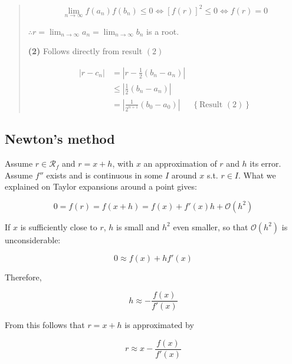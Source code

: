 \documentclass[12pt]{article}
\theoremstyle{definition}
\begin{document}
\begin{quote}
\begin{equation*}
    \lim_{n \to \infty} f(a_n)f(b_n) \leq 0 \iff [f(r)]^2 \leq 0 \iff f(r) = 0
\end{equation*}

$\therefore r = \lim_{n \to \infty} a_n = \lim_{n \to \infty} b_n$ is a root.

\textbf{(2)} Follows directly from result $(2)$

\begin{align*}
    \left| r - c_n \right|  &= \left| r - \frac{1}{2}(b_n - a_n) \right| \\ 
                            &\leq
    \left| \frac{1}{2}(b_n - a_n) \right| \\ 
&=\left| \frac{1}{2^{n+1}}(b_0 - a_0) \right| &\left\{ \text{Result }(2)
\right\} 
\end{align*}



\end{quote}
\normalsize

\pagebreak 

\subsection{Newton's method}


Assume $r \in \mathcal{R}_f$ and $r = x + h$, with $x$ an approximation of $r$
and $h$ its error. Assume $f''$ exists and is continuous in some $I$ around $x$
s.t. $r \in I$. What we explained on Taylor expansions around a point gives:

\begin{equation*}
    0 = f(r) = f(x + h) = f(x) + f'(x)h + \mathcal{O}(h^2)
\end{equation*}

If $x$ is sufficiently close to $r$, $h$ is small and $h^2$ even smaller, so
that $\mathcal{O}(h^2)$ is unconsiderable:

\begin{equation*}
    0 \approx f(x) + hf'(x)
\end{equation*}

Therefore, 

\begin{equation}
    h \approx - \frac{f(x)}{f'(x)}
\end{equation}

From this follows that $r = x + h$ is approximated by 

\begin{equation*}
    r \approx x - \frac{f(x)}{f'(x)}
\end{equation*}
\end{document}
